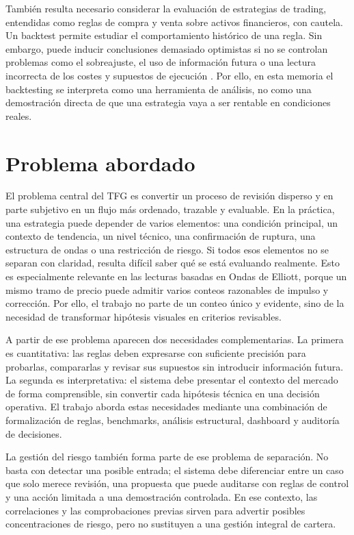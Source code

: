 Tambi\'en resulta necesario considerar la evaluaci\'on de estrategias de trading,
entendidas como reglas de compra y venta sobre activos financieros, con cautela.
Un backtest permite estudiar el comportamiento hist\'orico de una regla. Sin
embargo, puede inducir conclusiones demasiado optimistas si no se controlan
problemas como el sobreajuste, el uso de informaci\'on futura o una lectura
incorrecta de los costes y supuestos de ejecuci\'on
\cite{pardo_2008_trading_strategies,bailey_etal_2017_backtest_overfitting,lopez_de_prado_2018_afml}.
Por ello, en esta memoria el backtesting se interpreta como una herramienta de
an\'alisis, no como una demostraci\'on directa de que una estrategia vaya a ser
rentable en condiciones reales.

\section{Problema abordado}

El problema central del TFG es convertir un proceso de revisi\'on disperso y en
parte subjetivo en un flujo m\'as ordenado, trazable y evaluable. En la pr\'actica,
una estrategia puede depender de varios elementos: una condici\'on principal, un
contexto de tendencia, un nivel t\'ecnico, una confirmaci\'on de ruptura, una
estructura de ondas o una restricci\'on de riesgo. Si todos esos elementos no se
separan con claridad, resulta dif\'icil saber qu\'e se est\'a evaluando realmente.
Esto es especialmente relevante en las lecturas basadas en Ondas de Elliott,
porque un mismo tramo de precio puede admitir varios conteos razonables de
impulso y correcci\'on. Por ello, el trabajo no parte de un conteo \'unico y
evidente, sino de la necesidad de transformar hip\'otesis visuales en criterios
revisables.

A partir de ese problema aparecen dos necesidades complementarias. La primera
es cuantitativa: las reglas deben expresarse con suficiente precisi\'on para
probarlas, compararlas y revisar sus supuestos sin introducir informaci\'on
futura. La segunda es interpretativa: el sistema debe presentar el contexto del
mercado de forma comprensible, sin convertir cada hip\'otesis t\'ecnica en una
decisi\'on operativa. El trabajo aborda estas necesidades mediante una
combinaci\'on de formalizaci\'on de reglas, benchmarks, an\'alisis estructural,
dashboard y auditor\'ia de decisiones.

La gesti\'on del riesgo tambi\'en forma parte de ese problema de separaci\'on. No
basta con detectar una posible entrada; el sistema debe diferenciar entre un
caso que solo merece revisi\'on, una propuesta que puede auditarse con reglas de
control y una acci\'on limitada a una demostraci\'on controlada. En ese contexto,
las correlaciones y las comprobaciones previas sirven para advertir posibles
concentraciones de riesgo, pero no sustituyen a una gesti\'on integral de cartera.

